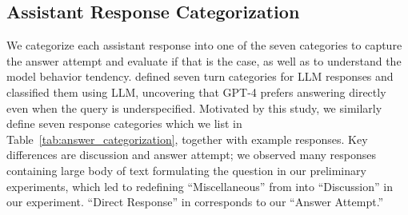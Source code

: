 \documentclass{article}
\begin{document}
\begin{appendices}
\section{Assistant Response Categorization} \label{app:answer_categorization}
We categorize each assistant response into one of the seven categories to capture the answer attempt and evaluate if that is the case, as well as to understand the model behavior tendency.
\citet{herlihy2024overcoming} defined seven turn categories for LLM responses and classified them using LLM, uncovering that GPT-4 prefers answering directly even when the query is underspecified.
Motivated by this study, we similarly define seven response categories which we list in Table~\ref{tab:answer_categorization}, together with example responses.
Key differences are discussion and answer attempt; we observed many responses containing large body of text formulating the question in our preliminary experiments, which led to redefining ``Miscellaneous'' from \citep{herlihy2024overcoming} into ``Discussion'' in our experiment.
``Direct Response'' in \citep{herlihy2024overcoming} corresponds to our ``Answer Attempt.''


\end{appendices}
\end{document}
